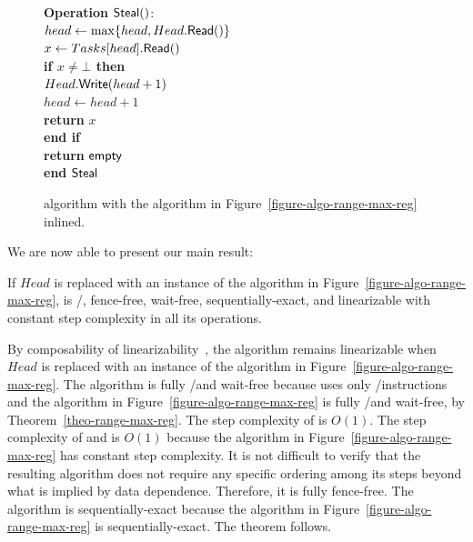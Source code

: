 \begin{figure}[H]
{{\begin{minipage}[t]{150mm}
\begin{tabbing}
          {\bf Operation} \({\sf Steal}()\): \\
           \> \> \(head \leftarrow \max\{head, Head.{\sf Read}()\}\)\\
           \> \> \(x \leftarrow Tasks[head].{\sf Read}()\) \\
           \> \> {\bf if \(x \neq \bot\) then}\\
           \> \> \> \(Head.{\sf Write}(head+1)\)\\
           \> \> \> \(head \leftarrow head+1\)\\
           \> \> \> {\bf return} \(x\)\\
           \> \> {\bf end if}\\
           \> \> {\bf return} ${\sf empty}$\\
          {\bf end} ${\sf Steal}$

        \end{tabbing}
      \end{minipage} }
    \caption{\label{figure-w-mult}\NCWSM algorithm with the \RangeMaxReg
      algorithm in Figure~\ref{figure-algo-range-max-reg} inlined.}
  }
\end{figure}

We are now able to present our main result:

\begin{theorem}\label{theo-wf-fully}
If \(Head\) is replaced with an instance of the algorithm in Figure~\ref{figure-algo-range-max-reg}, \NCWSM is \R/\W, fence-free, wait-free, sequentially-exact, and linearizable with constant step complexity in all its operations.
\end{theorem}

\begin{proofT}
By composability of linearizability~\cite{DBLP_journals_toplas_HerlihyW90}, the algorithm remains linearizable when \(Head\) is replaced with an instance of the algorithm in Figure~\ref{figure-algo-range-max-reg}. The algorithm is fully \R/\W and wait-free because \Put uses only \R/\W instructions and the \RangeMaxReg algorithm in Figure~\ref{figure-algo-range-max-reg} is fully \R/\W and wait-free, by Theorem~\ref{theo-range-max-reg}. The step complexity of \Put is $O(1)$. The step complexity of \Take and \Steal is $O(1)$ because the \RangeMaxReg algorithm in Figure~\ref{figure-algo-range-max-reg} has constant step complexity. It is not difficult to verify that the resulting algorithm does not require any specific ordering among its steps beyond what is implied by data dependence. Therefore, it is fully fence-free. The algorithm is sequentially-exact because the algorithm in Figure~\ref{figure-algo-range-max-reg} is sequentially-exact. The theorem follows.
\end{proofT}

